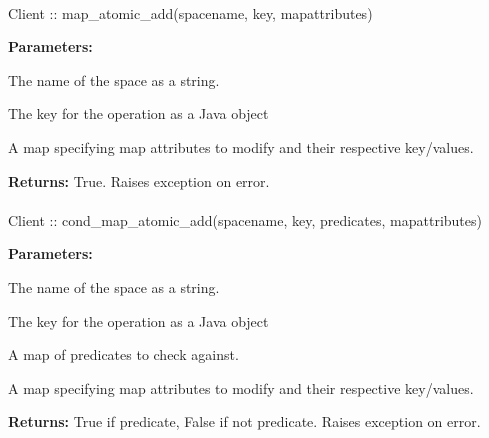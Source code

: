 \paragraph{}
\label{api:java:map_atomic_add}
\begin{javacode}
Client :: map_atomic_add(spacename, key, mapattributes)
\end{javacode}


\noindent\textbf{Parameters:}
\begin{description}[labelindent=\widthof{{\code{mapattributes}}},leftmargin=*,noitemsep,nolistsep,align=right]
\item[\code{spacename}] The name of the space as a string.
\item[\code{key}] The key for the operation as a Java object
\item[\code{mapattributes}] A map specifying map attributes to modify and their respective key/values.
\end{description}

\noindent\textbf{Returns:}
True.  Raises exception on error.

\paragraph{}
\label{api:java:cond_map_atomic_add}
\begin{javacode}
Client :: cond_map_atomic_add(spacename, key, predicates, mapattributes)
\end{javacode}


\noindent\textbf{Parameters:}
\begin{description}[labelindent=\widthof{{\code{mapattributes}}},leftmargin=*,noitemsep,nolistsep,align=right]
\item[\code{spacename}] The name of the space as a string.
\item[\code{key}] The key for the operation as a Java object
\item[\code{predicates}] A map of predicates to check against.
\item[\code{mapattributes}] A map specifying map attributes to modify and their respective key/values.
\end{description}

\noindent\textbf{Returns:}
True if predicate, False if not predicate.  Raises exception on error.

